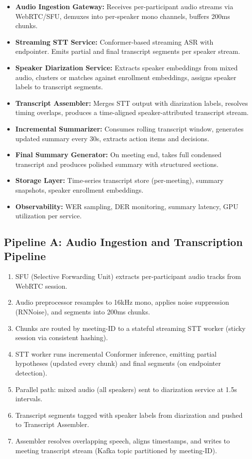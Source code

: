 \begin{itemize}
  \item \textbf{Audio Ingestion Gateway:} Receives per-participant audio streams via WebRTC/SFU, demuxes into per-speaker mono channels, buffers 200ms chunks.
  \item \textbf{Streaming STT Service:} Conformer-based streaming ASR with endpointer. Emits partial and final transcript segments per speaker stream.
  \item \textbf{Speaker Diarization Service:} Extracts speaker embeddings from mixed audio, clusters or matches against enrollment embeddings, assigns speaker labels to transcript segments.
  \item \textbf{Transcript Assembler:} Merges STT output with diarization labels, resolves timing overlaps, produces a time-aligned speaker-attributed transcript stream.
  \item \textbf{Incremental Summarizer:} Consumes rolling transcript window, generates updated summary every 30s, extracts action items and decisions.
  \item \textbf{Final Summary Generator:} On meeting end, takes full condensed transcript and produces polished summary with structured sections.
  \item \textbf{Storage Layer:} Time-series transcript store (per-meeting), summary snapshots, speaker enrollment embeddings.
  \item \textbf{Observability:} WER sampling, DER monitoring, summary latency, GPU utilization per service.
\end{itemize}

\subsection*{Pipeline A: Audio Ingestion and Transcription Pipeline}

\begin{enumerate}
  \item SFU (Selective Forwarding Unit) extracts per-participant audio tracks from WebRTC session.
  \item Audio preprocessor resamples to 16kHz mono, applies noise suppression (RNNoise), and segments into 200ms chunks.
  \item Chunks are routed by meeting-ID to a stateful streaming STT worker (sticky session via consistent hashing).
  \item STT worker runs incremental Conformer inference, emitting partial hypotheses (updated every chunk) and final segments (on endpointer detection).
  \item Parallel path: mixed audio (all speakers) sent to diarization service at 1.5s intervals.
  \item Transcript segments tagged with speaker labels from diarization and pushed to Transcript Assembler.
  \item Assembler resolves overlapping speech, aligns timestamps, and writes to meeting transcript stream (Kafka topic partitioned by meeting-ID).
\end{enumerate}


